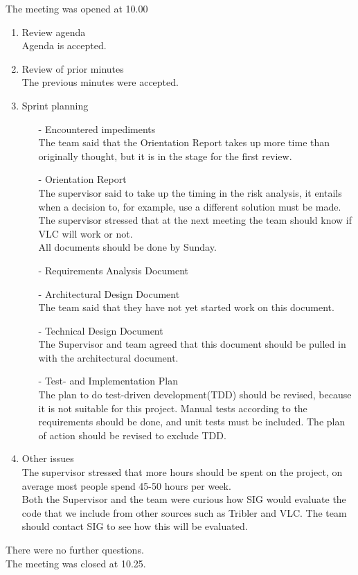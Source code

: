 \documentclass[pdftex, 12pt, a4paper]{report}
\begin{document}
\pagestyle{fancy}

The meeting was opened at 10.00

\begin{enumerate}
\item Review agenda	\\	
Agenda is accepted.
\item Review of prior minutes\\
The previous minutes were accepted.
\item Sprint planning
\begin{enumerate}
\item[-] Encountered impediments\\
The team said that the Orientation Report takes up more time than originally thought, but it is in the stage for the first review.
\item[-] Orientation Report\\
The supervisor said to take up the timing in the risk analysis, it entails when a decision to, for example, use a different solution must be made.\\
The supervisor stressed that at the next meeting the team should know if VLC will work or not.\\

All documents should be done by Sunday.
\item[-] Requirements Analysis Document\\
\item[-] Architectural Design Document\\
The team said that they have not yet started work on this document.
\item[-] Technical Design Document\\
The Supervisor and team agreed that this document should be pulled in with the architectural document.
\item[-] Test- and Implementation Plan\\
The plan to do test-driven development(TDD) should be revised, because it is not suitable for this project. Manual tests according to the requirements should be done, and unit tests must be included.
The plan of action should be revised to exclude TDD.\\
\end{enumerate}
\item Other issues\\
The supervisor stressed that more hours should be spent on the project, on average most people spend 45-50 hours per week.\\
Both the Supervisor and the team were curious how SIG would evaluate the code that we include from other sources such as Tribler and VLC. The team should contact SIG to see how this will be evaluated.

\end{enumerate}
There were no further questions.\\

\noindent The meeting was closed at 10.25.\\
\end{document}
